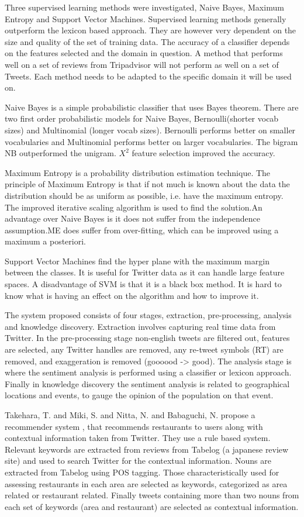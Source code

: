 Three supervised learning methods were investigated, Naive Bayes, Maximum Entropy and Support Vector Machines. Supervised learning methods generally outperform the lexicon based approach. They are however very dependent on the size and quality of the set of training data. The accuracy of a classifier depends on the features selected and the domain in question. A method that performs well on a set of reviews from Tripadvisor will not perform as well on a set of Tweets. Each method needs to be adapted to the specific domain it will be used on.

Naive Bayes is a simple probabilistic classifier that uses Bayes theorem. There are two first order probabilistic models for Naive Bayes, Bernoulli(shorter vocab sizes) and Multinomial (longer vocab sizes). Bernoulli performs better on smaller vocabularies and Multinomial performs better on larger vocabularies. The bigram NB outperformed the unigram. ${X}^2$ feature selection improved the accuracy.

Maximum Entropy is a probability distribution estimation technique. The principle of Maximum Entropy is that if not much is known about the data the distribution should be as uniform as possible, i.e. have the maximum entropy. The improved iterative scaling algorithm is used to find the solution.An advantage over Naive Bayes is it does not suffer from the independence assumption.ME does suffer from over-fitting, which can be improved using  a maximum a posteriori.

Support Vector Machines find the hyper plane with the maximum margin between the classes. It is useful for Twitter data as it can handle large feature spaces. A disadvantage of SVM is that it is a black box method. It is hard to know what is having an effect on the algorithm and how to improve it.

The system proposed consists of four stages, extraction, pre-processing, analysis and knowledge discovery. Extraction involves capturing real time data from Twitter. In the pre-processing stage non-english tweets are filtered out, features are selected, any Twitter handles are removed, any re-tweet symbols (RT) are removed, and exaggeration is removed (goooood -> good). The analysis stage is where the sentiment analysis is performed using a classifier or lexicon approach. Finally in knowledge discovery the sentiment analysis is related to geographical locations and events, to gauge the opinion of the population on that event.

Takehara, T. and Miki, S. and Nitta, N. and Babaguchi, N. propose a recommender system \cite{takeharaContext2012}, that recommends restaurants to users along with contextual information taken from Twitter. They use a rule based system. Relevant keywords are extracted from reviews from Tabelog (a japanese review site) and used to search Twitter for the contextual information. Nouns are extracted from Tabelog using POS tagging. Those characteristically used for assessing restaurants in each area are selected as keywords, categorized as area related or restaurant related. Finally tweets containing more than two nouns from each set of keywords (area and restaurant) are selected as contextual information.



